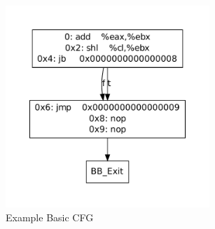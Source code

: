 \begin{figure}[!p]
  \begin{center}
    \includegraphics[height=3in]{chap-examples/cfg2.pdf}
  \end{center}
  \caption{Example Basic CFG}
  \label{fig:basiccfg}
\end{figure}

